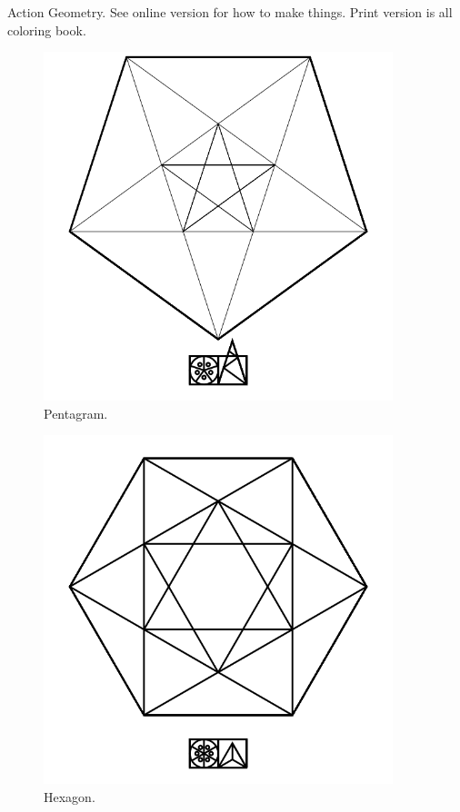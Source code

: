 Action Geometry. See online version for how to make things.  Print version is all coloring book.

\begin{figure}
	\centering
	\includegraphics[width=4in]{imageserver/uploadimages/image4.png}
	\caption{Pentagram.}
\end{figure}

\begin{figure}
	\centering
	\includegraphics[width=4in]{imageserver/uploadimages/image5.png}
	\caption{Hexagon.}
\end{figure}

